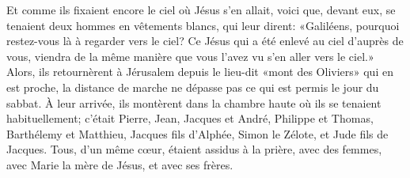 Et comme ils fixaient encore le ciel où Jésus s’en allait,
	voici que, devant eux, se tenaient deux hommes en vêtements blancs,
	qui leur dirent: «Galiléens,
	pourquoi restez-vous là à regarder vers le ciel?
	Ce Jésus qui a été enlevé au ciel d’auprès de vous,
	viendra de la même manière que vous l’avez vu s’en aller vers le ciel.»
Alors, ils retournèrent à Jérusalem
		depuis le lieu-dit «mont des Oliviers» qui en est proche,
	la distance de marche ne dépasse pas ce qui est permis le jour du sabbat.
À leur arrivée,
	ils montèrent dans la chambre haute où ils se tenaient habituellement;
	c’était Pierre, Jean, Jacques et André,
	Philippe et Thomas, Barthélemy et Matthieu,
	Jacques fils d’Alphée, Simon le Zélote, et Jude fils de Jacques.
Tous, d’un même cœur, étaient assidus à la prière,
	avec des femmes, avec Marie la mère de Jésus, et avec ses frères.
